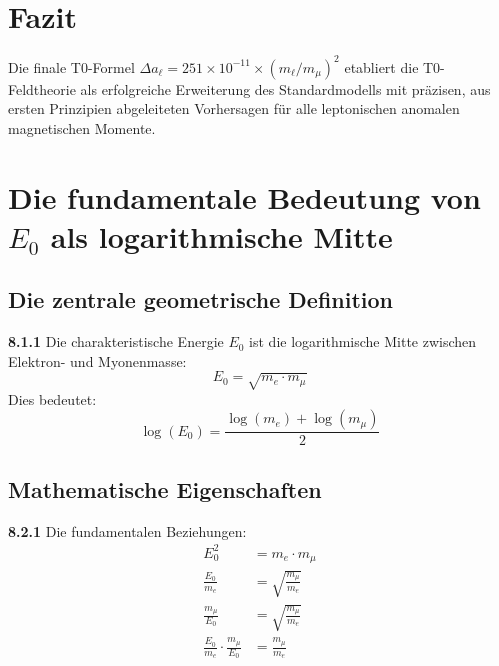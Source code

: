 \documentclass[12pt,a4paper]{article}
\newcommand{\Ezero}{E_0}
\begin{document}
	\section{Fazit}
	
	Die finale T0-Formel $\Delta a_\ell = 251 \times 10^{-11} \times (m_\ell/m_\mu)^2$ etabliert die T0-Feldtheorie als erfolgreiche Erweiterung des Standardmodells mit präzisen, aus ersten Prinzipien abgeleiteten Vorhersagen für alle leptonischen anomalen magnetischen Momente.

\section{Die fundamentale Bedeutung von $\Ezero$ als logarithmische Mitte}

\subsection{Die zentrale geometrische Definition}

\begin{tcolorbox}[colback=yellow!10!white,colframe=red!75!black,title=Fundamentale Definition]
	\noindent \textbf{8.1.1} Die charakteristische Energie $\Ezero$ ist die logarithmische Mitte zwischen Elektron- und Myonenmasse:
	\begin{equation}
		\boxed{\Ezero = \sqrt{m_e \cdot m_\mu}}
		\label{eq:E0_fundamental}
	\end{equation}
	Dies bedeutet:
	\begin{equation}
		\log(\Ezero) = \frac{\log(m_e) + \log(m_\mu)}{2}
		\label{eq:E0_logarithmic}
	\end{equation}
\end{tcolorbox}

\subsection{Mathematische Eigenschaften}

\noindent \textbf{8.2.1} Die fundamentalen Beziehungen:
\begin{align}
	\Ezero^2 &= m_e \cdot m_\mu \label{eq:E0_squared} \\
	\frac{\Ezero}{m_e} &= \sqrt{\frac{m_\mu}{m_e}} \label{eq:E0_ratio1} \\
	\frac{m_\mu}{\Ezero} &= \sqrt{\frac{m_\mu}{m_e}} \label{eq:E0_ratio2} \\
	\frac{\Ezero}{m_e} \cdot \frac{m_\mu}{\Ezero} &= \frac{m_\mu}{m_e} \label{eq:E0_product}
\end{align}
\end{document}
